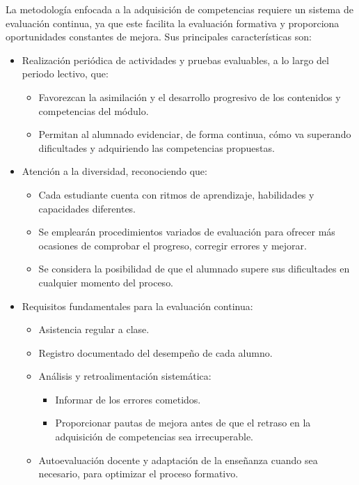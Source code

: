 La metodología enfocada a la adquisición de competencias requiere un sistema de evaluación continua, ya que este facilita la evaluación formativa y proporciona oportunidades constantes de mejora. Sus principales características son:

\begin{itemize}
  \item Realización periódica de actividades y pruebas evaluables, a lo largo del periodo lectivo, que:
    \begin{itemize}
      \item Favorezcan la asimilación y el desarrollo progresivo de los contenidos y competencias del módulo.
      \item Permitan al alumnado evidenciar, de forma continua, cómo va superando dificultades y adquiriendo las competencias propuestas.
    \end{itemize}

  \item Atención a la diversidad, reconociendo que:
    \begin{itemize}
      \item Cada estudiante cuenta con ritmos de aprendizaje, habilidades y capacidades diferentes.
      \item Se emplearán procedimientos variados de evaluación para ofrecer más ocasiones de comprobar el progreso, corregir errores y mejorar.
      \item Se considera la posibilidad de que el alumnado supere sus dificultades en cualquier momento del proceso.
    \end{itemize}

  \item Requisitos fundamentales para la evaluación continua:
    \begin{itemize}
      \item Asistencia regular a clase.
      \item Registro documentado del desempeño de cada alumno.
      \item Análisis y retroalimentación sistemática:
        \begin{itemize}
          \item Informar de los errores cometidos.
          \item Proporcionar pautas de mejora antes de que el retraso en la adquisición de competencias sea irrecuperable.
        \end{itemize}
      \item Autoevaluación docente y adaptación de la enseñanza cuando sea necesario, para optimizar el proceso formativo.
    \end{itemize}
\end{itemize}


